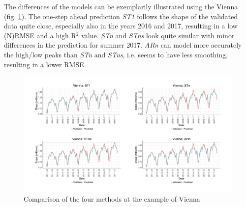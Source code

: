\documentclass[a4paper,reqno,]{article}
\begin{document}
\newpage
\noindent
The differences of the models can be exemplarily illustrated using the Vienna (fig. \ref{fig:STARIMA_Vienna}). The one-step ahead prediction \textit{ST1} follows the shape of the validated data quite close, especially also in the years 2016 and 2017, resulting in a low (N)RMSE and a high R$^2$ value. \textit{STn} and \textit{STns} look quite similar with minor differences in the prediction for summer 2017. \textit{ARn} can model more accurately the high/low peaks than \textit{STn} and \textit{STns}, i.e. seems to have less smoothing, resulting in a lower RMSE.
\begin{figure}[H]
\centering
\includegraphics[width=1\textwidth]{images/ARIMA/STARIMA_Vienna.pdf}
\caption{Comparison of the four methods at the example of Vienna}
\label{fig:STARIMA_Vienna}
\end{figure}
\end{document}
